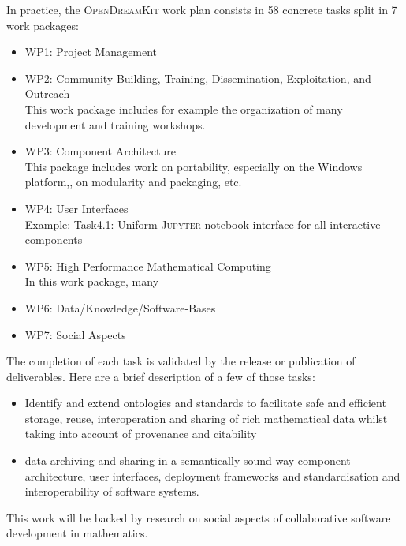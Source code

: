 \documentclass{llncs}
\newcommand{\software}[1]{\textsc{#1}\xspace}
\newcommand{\Jupyter}{\software{Jupyter}}
\newcommand{\ODK}{\software{OpenDreamKit}}
\begin{document}

In practice, the \ODK work plan consists in 58 concrete tasks split in
7 work packages:
\begin{itemize}
\item WP1: Project Management
\item WP2: Community Building, Training, Dissemination, Exploitation,
  and Outreach\\
  This work package includes for example the organization of many
  development and training workshops.
\item WP3: Component Architecture\\
  This package includes work on portability, especially on the Windows
  platform,, on modularity and packaging, etc.
\item WP4: User Interfaces\\
    Example: Task4.1: Uniform \Jupyter notebook interface for all interactive components

\item WP5: High Performance Mathematical Computing\\
  In this work package, many 

\item WP6: Data/Knowledge/Software-Bases
\item WP7: Social Aspects
\end{itemize}
The completion of each task is validated by the release or publication
of deliverables. Here are a brief description of a few of those tasks:

\begin{itemize}
\item Identify and extend ontologies and standards to facilitate safe
  and efficient storage, reuse, interoperation and sharing of rich
  mathematical data whilst taking into account of provenance and
  citability
\item data archiving and sharing in a semantically sound way component
  architecture, user interfaces, deployment frameworks and
  standardisation and interoperability of software systems.
\end{itemize}


This work will be backed by research on social aspects of
collaborative software development in mathematics.

\end{document}

